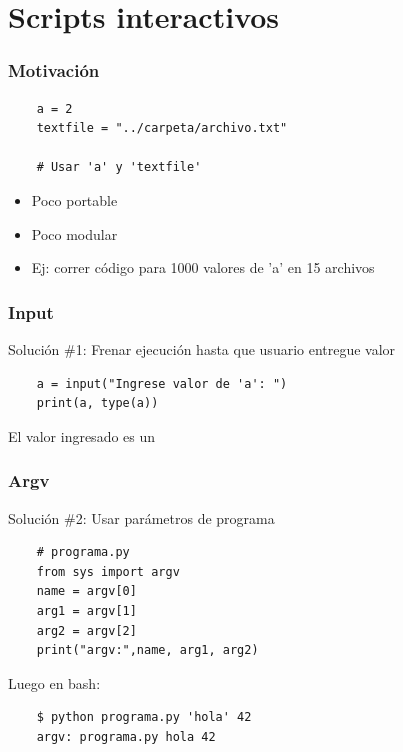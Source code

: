 \documentclass[14pt,aspectratio=169,xcolor=dvipsnames]{beamer}
\begin{document}
\section{Scripts interactivos}
\begin{frame}[fragile]\frametitle{Motivación}
    \begin{verbatim}
    a = 2
    textfile = "../carpeta/archivo.txt"
    
    # Usar 'a' y 'textfile'
    \end{verbatim}
    \begin{itemize}
        \item Poco portable
        \item Poco modular
        \item Ej: correr código para 1000 valores de 'a' en 15 archivos
    \end{itemize}

\pause {}
\end{frame}
\begin{frame}[fragile]\frametitle{Input}
    Solución \#1: Frenar ejecución hasta que usuario entregue valor
    
    \begin{verbatim}
    a = input("Ingrese valor de 'a': ")
    print(a, type(a))
    \end{verbatim}

    \vspace{1cm}
    El valor ingresado es un 
\end{frame}
\begin{frame}[fragile]\frametitle{Argv}
    Solución \#2: Usar parámetros de programa
    \begin{verbatim}
    # programa.py
    from sys import argv
    name = argv[0]
    arg1 = argv[1]
    arg2 = argv[2]
    print("argv:",name, arg1, arg2)
    \end{verbatim}

    Luego en bash:
    \begin{verbatim}
    $ python programa.py 'hola' 42
    argv: programa.py hola 42
    \end{verbatim}
\end{frame}
\begin{frame}


\end{frame}
\end{document}
